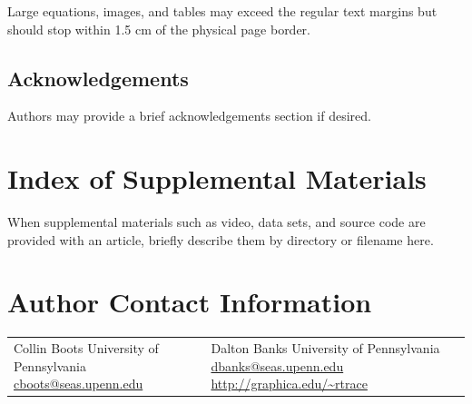 \documentclass{jcgt}
\begin{document}
Large equations, images, and tables may exceed the regular text margins but should stop within 1.5 cm of the physical page border.

\subsection*{Acknowledgements}
Authors may provide a brief acknowledgements section if desired.

\small



\section*{Index of Supplemental Materials}
When supplemental materials such as video, data sets, and source code are provided with an article, briefly describe them by directory or filename here.

\section*{Author Contact Information}

\hspace{-2mm}\begin{tabular}{p{}p{}}
Collin Boots \newline
University of Pennsylvania\newline
\href{mailto:cboots@seas.upenn.edu}{cboots@seas.upenn.edu}
&

Dalton Banks \newline
University of Pennsylvania\newline
\href{mailto:dbanks@seas.upenn.edu}{dbanks@seas.upenn.edu} \newline
\href{http://graphica.edu/~rtrace}{http://graphica.edu/\textasciitilde rtrace}

\end{tabular}


\afterdoc
\end{document}
